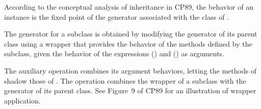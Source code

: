 \begin{AgdaAlign}
According to the conceptual analysis of inheritance in CP89,
the behavior of an instance  is the fixed point
of the generator associated with the class of .

The generator for a subclass is obtained by modifying the generator of its parent class
using a wrapper that provides the behavior of the methods defined by the subclass,
given the behavior of the expressions  ()
and  () as arguments.

The auxiliary operation  combines its argument behaviors,
letting the methods of  shadow those of .
The operation  combines the wrapper of a subclass with the generator of its parent class.
See Figure~9 of CP89 for an illustration of wrapper application.
%
\begin{code}%
%
\>[2]\AgdaSpace{}%
\AgdaSymbol{=}\AgdaSpace{}%
\AgdaSpace{}%
\AgdaSpace{}%
\AgdaSpace{}%
\AgdaSpace{}%
\AgdaSpace{}%
\AgdaSpace{}%
\<%
\\
%
\>[2]%
\>[12]\AgdaSymbol{=}\AgdaSpace{}%
\AgdaSpace{}%
\AgdaSpace{}%
\AgdaSpace{}%
\AgdaSpace{}%
\AgdaSpace{}%
\AgdaSpace{}%
\AgdaSpace{}%
\AgdaSpace{}%
\AgdaSpace{}%
\AgdaSpace{}%
\<%
\\
%
\\[\AgdaEmptyExtraSkip]%
%
\>[2]\AgdaSpace{}%
\AgdaSymbol{:}\AgdaSpace{}%
\AgdaSpace{}%
\AgdaSpace{}%
\AgdaSpace{}%
\AgdaSpace{}%
\AgdaSpace{}%
\AgdaSpace{}%
\AgdaSpace{}%
\AgdaSpace{}%
\AgdaSpace{}%
\AgdaSpace{}%
\<%
\\
%
\>[2]\AgdaSpace{}%
\AgdaSpace{}%
\AgdaSpace{}%
\AgdaSymbol{=}\AgdaSpace{}%
\AgdaSpace{}%
\AgdaSpace{}%

\end{code}
\end{AgdaAlign}

